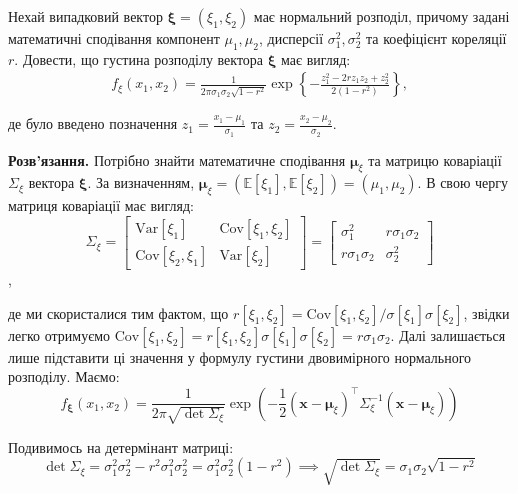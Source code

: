 \documentclass{hw_template}
\begin{document}
\begin{problem}
    Нехай випадковий вектор $\boldsymbol{\xi} = (\xi_1,\xi_2)$ має нормальний розподіл, причому задані математичні сподівання компонент $\mu_1,\mu_2$, дисперсії $\sigma_1^2,\sigma_2^2$ та коефіцієнт кореляції $r$. Довести, що густина розподілу вектора $\boldsymbol{\xi}$ має вигляд:
    \begin{align*}
        f_{\xi}(x_1,x_2) = \frac{1}{2\pi\sigma_1\sigma_2\sqrt{1-r^2}}\exp\left\{-\frac{z_1^2 - 2rz_1z_2 + z_2^2}{2(1-r^2)}\right\},
    \end{align*}

    де було введено позначення $z_1 = \frac{x_1-\mu_1}{\sigma_1}$ та $z_2 = \frac{x_2-\mu_2}{\sigma_2}$.
\end{problem}

\textbf{Розв'язання.} Потрібно знайти математичне сподівання $\boldsymbol{\mu}_{\xi}$ та матрицю коваріації $\Sigma_{\xi}$ вектора $\boldsymbol{\xi}$. За визначенням, $\boldsymbol{\mu}_{\xi} = (\mathbb{E}[\xi_1],\mathbb{E}[\xi_2])=(\mu_1,\mu_2)$. В свою чергу матриця коваріації має вигляд:
\begin{equation*}
    \Sigma_{\xi} = \begin{bmatrix}
        \text{Var}[\xi_1] & \text{Cov}[\xi_1,\xi_2] \\
        \text{Cov}[\xi_2,\xi_1] & \text{Var}[\xi_2]
    \end{bmatrix} = \begin{bmatrix}
        \sigma_1^2 & r\sigma_1\sigma_2 \\
        r\sigma_1\sigma_2 & \sigma_2^2
    \end{bmatrix}
\end{equation*},

де ми скористалися тим фактом, що $r[\xi_1,\xi_2] = \text{Cov}[\xi_1,\xi_2]\big/\sigma[\xi_1]\sigma[\xi_2]$, звідки легко отримуємо $\text{Cov}[\xi_1,\xi_2] = r[\xi_1,\xi_2]\sigma[\xi_1]\sigma[\xi_2] = r\sigma_1\sigma_2$. Далі залишається лише підставити ці значення у формулу густини двовимірного нормального розподілу. Маємо:
\begin{equation*}
    f_{\boldsymbol{\xi}}(x_1,x_2) = \frac{1}{2\pi\sqrt{\det\Sigma_{\xi}}}\exp\left(-\frac{1}{2}(\boldsymbol{x}-\boldsymbol{\mu}_{\xi})^{\top}\Sigma_{\xi}^{-1}(\boldsymbol{x}-\boldsymbol{\mu}_{\xi})\right)
\end{equation*}

Подивимось на детермінант матриці:
\begin{equation*}
    \det\Sigma_{\xi} = \sigma_1^2\sigma_2^2 - r^2\sigma_1^2\sigma_2^2 = \sigma_1^2\sigma_2^2(1-r^2) \implies \sqrt{\det \Sigma_{\xi}} = \sigma_1\sigma_2\sqrt{1-r^2}
\end{equation*}
\end{document}
